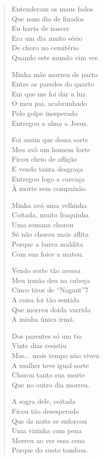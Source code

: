 \begin{verse}
Entenderam os maus fados\\
Que num dia de finados\\
Eu havia de nascer\\
Era um dia muito sério\\
De choro no cemitério\\
Quando este mundo vim ver.

Minha mãe morreu de parto\\
Entre as paredes do quarto\\
Em que me foi dar a luz\\
O meu pai, acabrunhado\\
Pelo golpe inesperado\\
Entregou a alma a Jesus.

Foi assim que dessa sorte\\
Meu avô um homem forte\\
Ficou cheio de aflição\\
E vendo tanta desgraça\\
Entregou logo a carcaça\\
À morte sem compaixão.


Minha avó uma velhinha\\
Coitada, muito fraquinha\\
Uma semana chorou\\
Só não chorou mais aflita\\
Porque a barca  maldita\\
Com sua foice a matou.

Vendo sorte tão avessa\\
Meu irmão deu na cabeça\\
Cinco tiros de “Nagant”7 \\
A coisa foi tão sentida\\
Que morreu doida varrida\\
A minha única irmã.

Dos parentes só um tio\\
Vinte dias resistiu\\
Mas... mais tempo não viveu\\
A mulher teve igual sorte\\
Chorou tanto sua morte\\
Que no outro dia morreu.

A sogra dele, coitada\\
Ficou tão desesperada\\
Que de noite se enforcou\\
Uma vizinha com pena\\
Morreu ao ver essa cena\\
Porque do susto tombou.



\end{verse}
